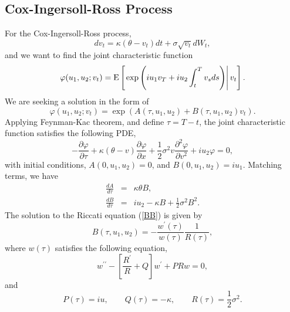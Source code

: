 \documentclass[12pt]{article}
\begin{document}
  \subsection{Cox-Ingersoll-Ross Process}

    For the Cox-Ingersoll-Ross process,
    \begin{equation}
      dv_t = \kappa(\theta - v_t)dt + \sigma\sqrt{v_t}dW_t,
    \end{equation}
    and we want to find the joint characteristic function
    \begin{equation}
      \varphi(u_1,u_2;v_t)={\rm E}\left[\left. \exp\left(iu_1v_T+iu_2\int_t^Tv_sds\right)\right| v_t\right].
    \end{equation}
    We are seeking a solution in the form of
    \begin{equation}
      \varphi(u_1,u_2;v_t)=\exp\left(A(\tau,u_1,u_2)+B(\tau,u_1,u_2)v_t\right).
    \end{equation}
    Applying Feynman-Kac theorem, and define $\tau=T-t$, the joint characteristic function satisfies the following PDE,
    \begin{equation}
      -\frac{\partial \varphi}{\partial \tau}
      + \kappa(\theta - v)\frac{\partial \varphi}{\partial x}
      +\frac{1}{2}\sigma^2v\frac{\partial^2 \varphi}{\partial v^2}
      +iu_2\varphi = 0,
    \end{equation}
    with initial conditions, $A(0,u_1,u_2)=0$, and $B(0,u_1,u_2)=iu_1$. Matching terms, we have
    \begin{eqnarray}
      \frac{dA}{d\tau} &=& \kappa\theta B, \label{AA} \\
      \frac{dB}{d\tau} &=& iu_2 - \kappa B + \frac{1}{2}\sigma^2B^2. \label{BB}
    \end{eqnarray}
    The solution to the Riccati equation (\ref{BB}) is given by
    \begin{equation}
      B(\tau,u_1,u_2)=-\frac{w^{\prime}(\tau)}{w(\tau)}\frac{1}{R(\tau)},
    \end{equation}
    where $w(\tau)$ satisfies the following equation,
    \begin{equation}
      w^{\prime\prime}-\left[\frac{R^{\prime}}{R}+Q\right]w^{\prime}+PRw=0,
    \end{equation}
    and
    \begin{equation}
      P(\tau) = iu, \quad\quad Q(\tau)=-\kappa, \quad\quad R(\tau)=\frac{1}{2}\sigma^2.
    \end{equation}


\end{document}
